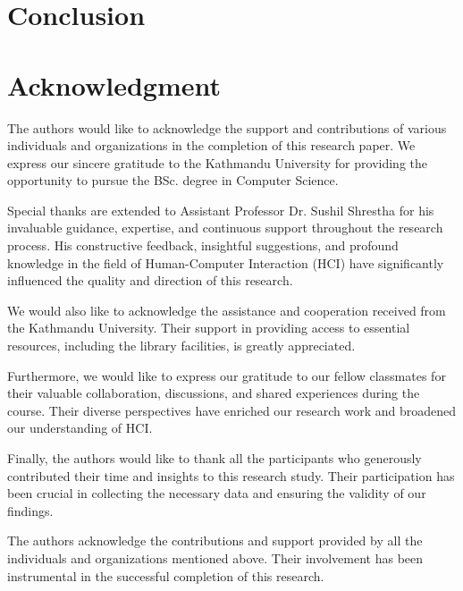 \documentclass[journal]{IEEEtran}
\begin{document}
\section{Conclusion}

\section*{Acknowledgment}
The authors would like to acknowledge the support and contributions of various
individuals and organizations in the completion of this research paper. We
express our sincere gratitude to the Kathmandu University for providing the
opportunity to pursue the BSc. degree in Computer Science.

Special thanks are extended to Assistant Professor Dr. Sushil Shrestha for
his invaluable guidance, expertise, and continuous support throughout the
research process. His constructive feedback, insightful suggestions, and
profound knowledge in the field of Human-Computer Interaction (HCI) have
significantly influenced the quality and direction of this research.

We would also like to acknowledge the assistance and cooperation received
from the  Kathmandu University. Their support in providing access to essential
resources, including the library facilities, is greatly appreciated.

Furthermore, we would like to express our gratitude to our fellow classmates
for their valuable collaboration, discussions, and shared experiences during
the course. Their diverse perspectives have enriched our research work and
broadened our understanding of HCI.

Finally, the authors would like to thank all the participants who generously
contributed their time and insights to this research study. Their participation
has been crucial in collecting the necessary data and ensuring the validity of
our findings.

The authors acknowledge the contributions and support provided by all the
individuals and organizations mentioned above. Their involvement has been
instrumental in the successful completion of this research.

\ifCLASSOPTIONcaptionsoff
    \newpage
\fi



\end{document}
